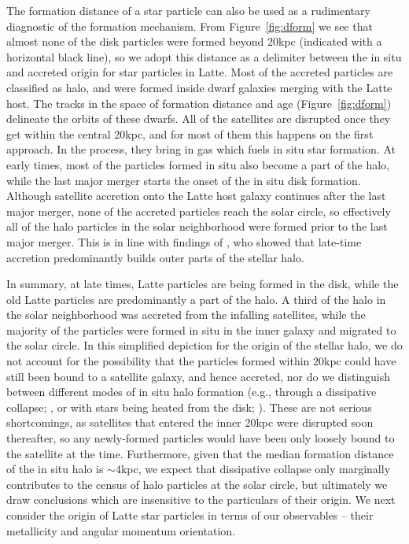 \documentclass[apj, twocolappendix, numberedappendix, appendixfloats]{emulateapj}
\begin{document}
The formation distance of a star particle can also be used as a rudimentary diagnostic of the formation mechanism.
From Figure~\ref{fig:dform} we see that almost none of the disk particles were formed beyond 20\;kpc (indicated with a horizontal black line), so we adopt this distance as a delimiter between the in situ and accreted origin for star particles in Latte.
Most of the accreted particles are classified as halo, and were formed inside dwarf galaxies merging with the Latte host.
The tracks in the space of formation distance and age (Figure~\ref{fig:dform}) delineate the orbits of these dwarfs.
All of the satellites are disrupted once they get within the central 20\;kpc, and for most of them this happens on the first approach.
In the process, they bring in gas which fuels in situ star formation.
At early times, most of the particles formed in situ also become a part of the halo, while the last major merger starts the onset of the in situ disk formation.
Although satellite accretion onto the Latte host galaxy continues after the last major merger, none of the accreted particles reach the solar circle, so effectively all of the halo particles in the solar neighborhood were formed prior to the last major merger.
This is in line with findings of \citet{zolotov2009}, who showed that late-time accretion predominantly builds outer parts of the stellar halo.

In summary, at late times, Latte particles are being formed in the disk, while the old Latte particles are predominantly a part of the halo.
A third of the halo in the solar neighborhood was accreted from the infalling satellites, while the majority of the particles were formed in situ in the inner galaxy and migrated to the solar circle.
In this simplified depiction for the origin of the stellar halo, we do not account for the possibility that the particles formed within 20\;kpc could have still been bound to a satellite galaxy, and hence accreted, nor do we distinguish between different modes of in situ halo formation (e.g., through a dissipative collapse; \citealt{samland2003}, or with stars being heated from the disk; \citealt{purcell2010}).
These are not serious shortcomings, as satellites that entered the inner 20\;kpc were disrupted soon thereafter, so any newly-formed particles would have been only loosely bound to the satellite at the time.
Furthermore, given that the median formation distance of the in situ halo is $\sim4$\;kpc, we expect that dissipative collapse only marginally contributes to the census of halo particles at the solar circle, but ultimately we draw conclusions which are insensitive to the particulars of their origin.
We next consider the origin of Latte star particles in terms of our observables -- their metallicity and angular momentum orientation.
\end{document}
